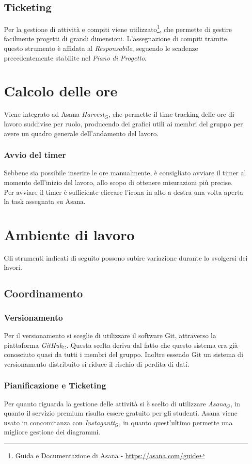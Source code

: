 \subsection{Ticketing}
Per la gestione di attività e compiti viene utilizzato\footnote{Guida e Documentazione di Asana - \url{https://asana.com/guide}}, che permette di gestire facilmente progetti di grandi dimensioni.
L'assegnazione di compiti tramite questo strumento è affidata al \textit{Responsabile}, seguendo le scadenze precedentemente stabilite nel \textit{Piano di Progetto}.

\section{Calcolo delle ore} \label{calcoloOre}
Viene integrato ad Asana \textit{Harvest$_{G}$}, che permette il time tracking delle ore di lavoro suddivise per ruolo, producendo dei grafici utili ai membri del gruppo per avere un quadro generale dell'andamento del lavoro.
\subsubsection{Avvio del timer}
Sebbene sia possibile inserire le ore manualmente, è consigliato avviare il timer al momento dell'inizio del lavoro, allo scopo di ottenere misurazioni più precise.\\
Per avviare il timer è sufficiente cliccare l'icona in alto a destra una volta aperta la task assegnata su Asana.

\section{Ambiente di lavoro}
Gli strumenti indicati di seguito possono subire variazione durante lo svolgersi dei lavori.
\subsection{Coordinamento}
\subsubsection{Versionamento}
Per il versionamento si sceglie di utilizzare il software Git, attraverso la piattaforma \textit{GitHub$_{G}$}. Questa scelta deriva dal fatto che questo sistema era già conosciuto quasi da tutti i membri del gruppo. Inoltre essendo Git un sistema di versionamento distribuito si riduce il rischio di perdita di dati. 
\subsubsection{Pianificazione e Ticketing}
Per quanto riguarda la gestione delle attività si è scelto di utilizzare \textit{Asana$_{G}$}, in quanto il servizio premium risulta essere gratuito per gli studenti. Asana viene usato in concomitanza con \textit{Instagantt$_{G}$}, in quanto quest'ultimo permette una migliore gestione dei diagrammi.
